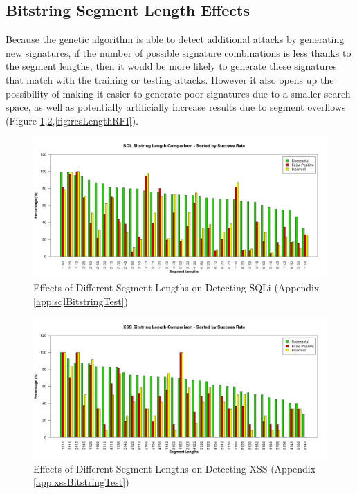 \newpage
\subsection{Bitstring Segment Length Effects} \label{sec:resSegment}

Because the genetic algorithm is able to detect additional attacks by generating new signatures, if the number of possible signature combinations is less thanks to the segment lengths, then it would be more likely to generate these signatures that match with the training or testing attacks.  However it also opens up the possibility of making it easier to generate poor signatures due to a smaller search space, as well as potentially artificially increase results due to segment overflows (Figure \ref{fig:resLengthSQL},\ref{fig:resLengthXSS},\ref{fig:resLengthRFI}).

\begin{figure}[hb]
	\centering
	\includegraphics[width=450px]{./assets/results/ga/bitlength/Results_SuccessRate_SQL.png}
	\caption{Effects of Different Segment Lengths on Detecting SQLi (Appendix \ref{app:sqlBitstringTest})}
	\label{fig:resLengthSQL}
\end{figure}

\newpage
\begin{figure}[H]
	\centering
	\includegraphics[width=450px]{./assets/appendix/fullresults/ga/bitlength/Results_SuccessRate_XSS.png}
	\caption{Effects of Different Segment Lengths on Detecting XSS (Appendix \ref{app:xssBitstringTest})}
	\label{fig:resLengthXSS}
\end{figure}


